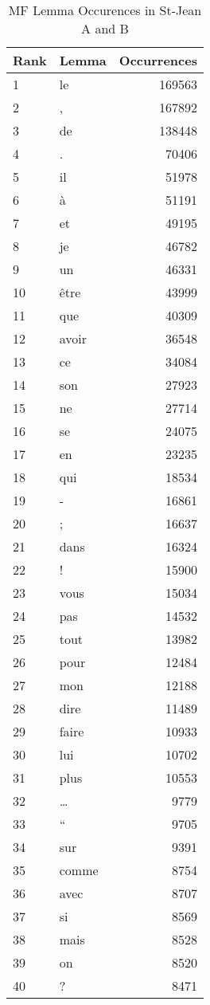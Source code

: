 \begin{table}
  \centering
  \caption{MF Lemma Occurences in St-Jean A and B}
  \label{tab:lemmas_occurences_st_jean}
  \begin{tabular}{l l r}
    \toprule
    Rank & Lemma & Occurrences \\
    \midrule
    1 & le & 169563 \\
    2 & , & 167892 \\
    3 & de & 138448 \\
    4 & . & 70406 \\
    5 & il & 51978 \\
    6 & à & 51191 \\
    7 & et & 49195 \\
    8 & je & 46782 \\
    9 & un & 46331 \\
    10 & être & 43999 \\
    11 & que & 40309 \\
    12 & avoir & 36548 \\
    13 & ce & 34084 \\
    14 & son & 27923 \\
    15 & ne & 27714 \\
    16 & se & 24075 \\
    17 & en & 23235 \\
    18 & qui & 18534 \\
    19 & - & 16861 \\
    20 & ; & 16637 \\
    21 & dans & 16324 \\
    22 & ! & 15900 \\
    23 & vous & 15034 \\
    24 & pas & 14532 \\
    25 & tout & 13982 \\
    26 & pour & 12484 \\
    27 & mon & 12188 \\
    28 & dire & 11489 \\
    29 & faire & 10933 \\
    30 & lui & 10702 \\
    31 & plus & 10553 \\
    32 & … & 9779 \\
    33 & “ & 9705 \\
    34 & sur & 9391 \\
    35 & comme & 8754 \\
    36 & avec & 8707 \\
    37 & si & 8569 \\
    38 & mais & 8528 \\
    39 & on & 8520 \\
    40 & ? & 8471 \\
    \bottomrule
  \end{tabular}
\end{table}

